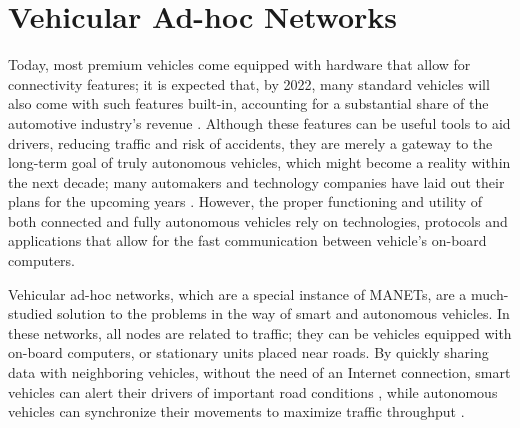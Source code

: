 \chapter{Vehicular Ad-hoc Networks}
\label{chap:vanets}

Today, most premium vehicles come equipped with hardware that allow for connectivity features; it is expected that, by 2022, many standard vehicles will also come with such features built-in, accounting for a substantial share of the automotive industry's revenue \cite{connectedcar2016}.
Although these features can be useful tools to aid drivers, reducing traffic and risk of accidents, they are merely a gateway to the long-term goal of truly autonomous vehicles, which might become a reality within the next decade; many automakers and technology companies have laid out their plans for the upcoming years \cite{tesla2016}.
However, the proper functioning and utility of both connected and fully autonomous vehicles rely on technologies, protocols and applications that allow for the fast communication between vehicle's on-board computers.

Vehicular ad-hoc networks, which are a special instance of MANETs, are a much-studied solution to the problems in the way of smart and autonomous vehicles.
In these networks, all nodes are related to traffic; they can be vehicles equipped with on-board computers, or stationary units placed near roads.
By quickly sharing data with neighboring vehicles, without the need of an Internet connection, smart vehicles can alert their drivers of important road conditions \cite{barba2012smart}, while autonomous vehicles can synchronize their movements to maximize traffic throughput \cite{amoozadeh2015platoon}.



